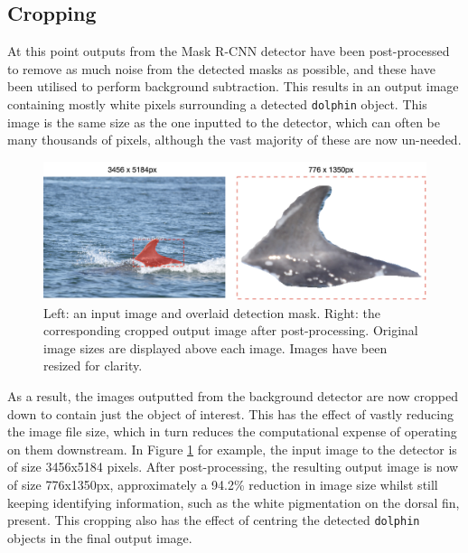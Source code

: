 \subsection{Cropping}\label{ch:cetDet,sec:postProcessing,su:cropping}

At this point outputs from the Mask R-CNN detector have been post-processed to remove as much noise from the detected masks as possible, and these have been utilised to perform background subtraction. This results in an output image containing mostly white pixels surrounding a detected \texttt{dolphin} object. This image is the same size as the one inputted to the detector, which can often be many thousands of pixels, although the vast majority of these are now un-needed.

\begin{figure}
	\begin{center}
		\includegraphics[scale=0.5]{Chapter3/figs/fin-extraction-unclean-updated.png}
	\end{center}
	\caption[Left: an input image and overlaid detection mask. Right: the corresponding cropped output image after post-processing.]{Left: an input image and overlaid detection mask. Right: the corresponding cropped output image after post-processing. Original image sizes are displayed above each image. Images have been resized for clarity.}\label{fig:190627-001-MOLS0028_-crop}
\end{figure}

As a result, the images outputted from the background detector are now cropped down to contain just the object of interest. This has the effect of vastly reducing the image file size, which in turn reduces the computational expense of operating on them downstream. In Figure \ref{fig:190627-001-MOLS0028_-crop} for example, the input image to the detector is of size 3456x5184 pixels. After post-processing, the resulting output image is now of size 776x1350px, approximately a 94.2\% reduction in image size whilst still keeping identifying information,  such as the white pigmentation on the dorsal fin, present. This cropping also has the effect of centring the detected \texttt{dolphin} objects in the final output image. 

